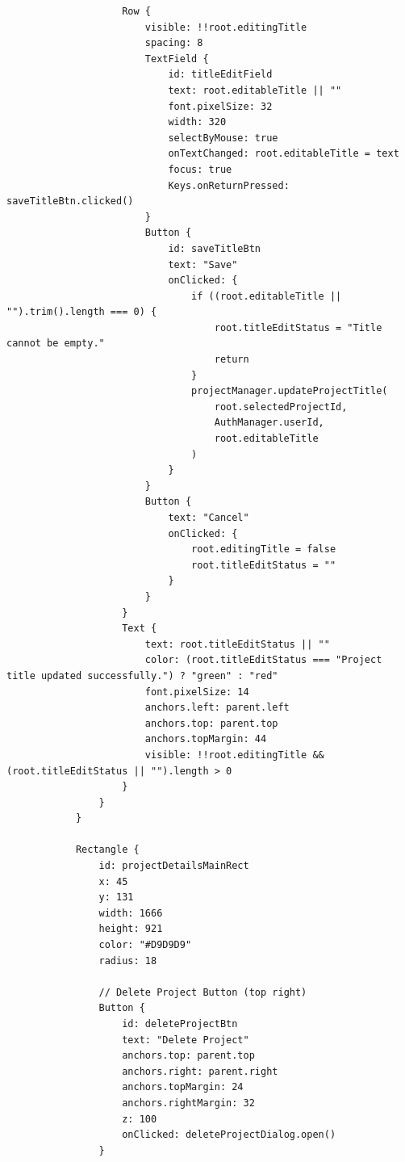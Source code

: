 \documentclass{report}
\begin{document}
\begin{lstlisting}
                    Row {
                        visible: !!root.editingTitle
                        spacing: 8
                        TextField {
                            id: titleEditField
                            text: root.editableTitle || ""
                            font.pixelSize: 32
                            width: 320
                            selectByMouse: true
                            onTextChanged: root.editableTitle = text
                            focus: true
                            Keys.onReturnPressed: saveTitleBtn.clicked()
                        }
                        Button {
                            id: saveTitleBtn
                            text: "Save"
                            onClicked: {
                                if ((root.editableTitle || "").trim().length === 0) {
                                    root.titleEditStatus = "Title cannot be empty."
                                    return
                                }
                                projectManager.updateProjectTitle(
                                    root.selectedProjectId,
                                    AuthManager.userId,
                                    root.editableTitle
                                )
                            }
                        }
                        Button {
                            text: "Cancel"
                            onClicked: {
                                root.editingTitle = false
                                root.titleEditStatus = ""
                            }
                        }
                    }
                    Text {
                        text: root.titleEditStatus || ""
                        color: (root.titleEditStatus === "Project title updated successfully.") ? "green" : "red"
                        font.pixelSize: 14
                        anchors.left: parent.left
                        anchors.top: parent.top
                        anchors.topMargin: 44
                        visible: !!root.editingTitle && (root.titleEditStatus || "").length > 0
                    }
                }
            }

            Rectangle {
                id: projectDetailsMainRect
                x: 45
                y: 131
                width: 1666
                height: 921
                color: "#D9D9D9"
                radius: 18

                // Delete Project Button (top right)
                Button {
                    id: deleteProjectBtn
                    text: "Delete Project"
                    anchors.top: parent.top
                    anchors.right: parent.right
                    anchors.topMargin: 24
                    anchors.rightMargin: 32
                    z: 100
                    onClicked: deleteProjectDialog.open()
                }


\end{lstlisting}
\end{document}
